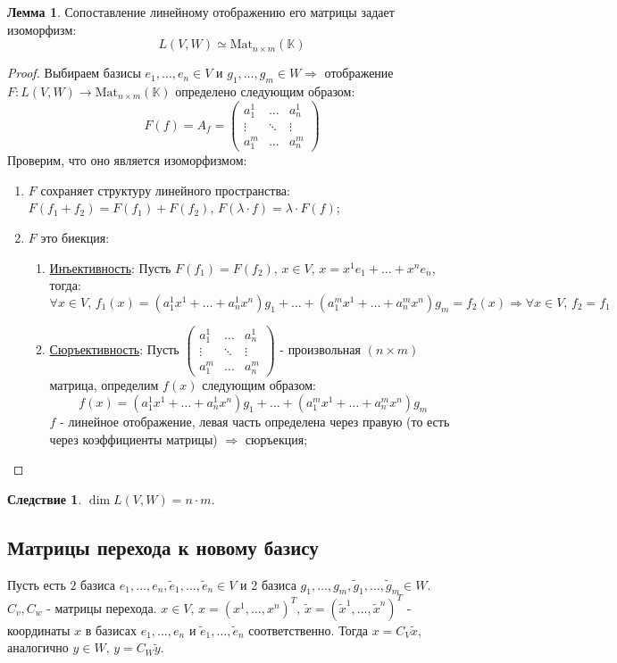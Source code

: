 \documentclass[12pt]{article}
\newcommand{\MK}{\mathbb{K}}
\theoremstyle{definition}
\newtheorem{lemma}{Лемма}
\newtheorem{corollary}{Следствие}
\newcommand{\wte}[1]{\widetilde{#1}}
\begin{document}
\begin{lemma}
	Сопоставление линейному отображению его матрицы задает изоморфизм: 
	$$
		L(V,W) \simeq \text{Mat}_{n \times m}(\MK)
	$$
\end{lemma}
\begin{proof}
	Выбираем базисы $e_1, \dotsc, e_n \in V$ и $g_1, \dotsc, g_m \in W \Rightarrow$ отображение $F \colon L(V,W) \to \text{Mat}_{n \times m}(\MK)$ определено следующим образом:
	$$
		F(f) = A_f = 	
		\begin{pmatrix}
			a_1^1 & \dotsc & a_n^1 \\
			\vdots & \ddots & \vdots \\
			a_1^m & \dotsc & a_n^m 
		\end{pmatrix}
	$$
	Проверим, что оно является изоморфизмом:
	\begin{enumerate}[label ={(\arabic*)}]
		\item $F$ сохраняет структуру линейного пространства: $F(f_1 + f_2) = F(f_1) + F(f_2), \, F(\lambda{\cdot}f) = \lambda{\cdot}F(f)$;
		\item $F$ это биекция:
		\begin{enumerate}[label ={\arabic*)}]
			\item \uline{Инъективность}: Пусть $F(f_1) = F(f_2), \, x \in V, \, x = x^1e_1 + \dotsc + x^n e_n$, тогда:
			$$
				\forall x \in V, \, f_1(x) = (a_1^1 x^1 + \dotsc + a_n^1 x^n) g_1 + \dotsc + (a_1^m x^1 + \dotsc + a_n^m x^n)g_m = f_2(x) \Rightarrow \forall x \in V, \, f_2 = f_1
			$$
			\item \uline{Сюръективность}: Пусть $
			\begin{pmatrix}
				a_1^1 & \dotsc & a_n^1 \\
				\vdots & \ddots & \vdots \\
				a_1^m & \dotsc & a_n^m 
			\end{pmatrix}$ - произвольная $(n\times m)$ матрица, определим $f(x)$ следующим образом:
			$$
				f(x) = (a_1^1 x^1 + \dotsc + a_n^1 x^n) g_1 + \dotsc + (a_1^m x^1 + \dotsc + a_n^m x^n)g_m
			$$
			$f$ - линейное отображение, левая часть определена через правую (то есть через коэффициенты матрицы) $\Rightarrow$ сюръекция;
		\end{enumerate}
	\end{enumerate}
\end{proof}
\begin{corollary}
	$\dim L(V,W) = n{\cdot}m$.
\end{corollary}
\subsection*{Матрицы перехода к новому базису}
Пусть есть $2$ базиса $e_1, \dotsc, e_n, \wte{e}_1, \dotsc, \wte{e}_n \in V$ и 2 базиса $g_1, \dotsc, g_m , \wte{g}_1,\dotsc, \wte{g}_m \in W$. $C_v, C_w$ - матрицы перехода. 
$x \in V, \, x = (x^1, \dotsc, x^n)^T, \, \wte{x} = (\wte{x}^1,\dotsc, \wte{x}^n)^T$ - координаты $x$ в базисах $e_1, \dotsc, e_n$ и $\wte{e}_1,\dotsc, \wte{e}_n$ соответственно.
Тогда $x = C_V \wte{x}$, аналогично $y \in W, \, y = C_W \wte{y}$.
\end{document}
